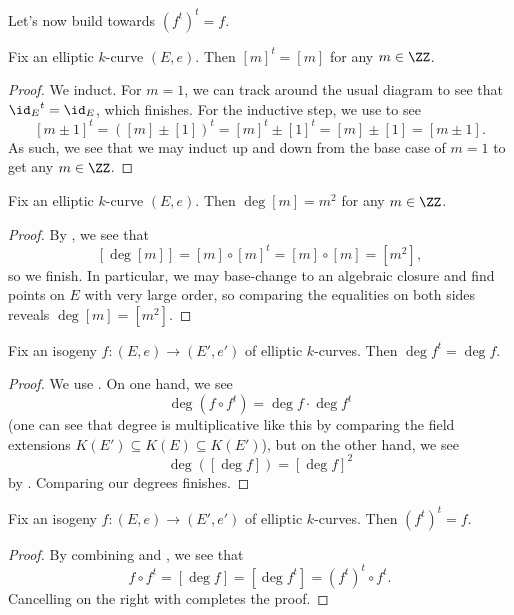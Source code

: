 \documentclass[../notes.tex]{subfiles}
\begin{document}
Let's now build towards $(f^t)^t=f$.
\begin{lemma} \label{lem:dual-mult}
	Fix an elliptic $k$-curve $(E,e)$. Then $[m]^t=[m]$ for any $m\in\ZZ$.
\end{lemma}
\begin{proof}
	We induct. For $m=1$, we can track around the usual diagram to see that ${\id_E}^t={\id_E}$, which finishes. For the inductive step, we use  to see
	\[[m\pm 1]^t=([m]\pm[1])^t=[m]^t\pm[1]^t=[m]\pm[1]=[m\pm1].\]
	As such, we see that we may induct up and down from the base case of $m=1$ to get any $m\in\ZZ$.
\end{proof}
\begin{corollary} \label{cor:deg-mult}
	Fix an elliptic $k$-curve $(E,e)$. Then $\deg[m]=m^2$ for any $m\in\ZZ$.
\end{corollary}
\begin{proof}
	By , we see that
	\[[\deg[m]]=[m]\circ[m]^t=[m]\circ[m]=\left[m^2\right],\]
	so we finish. In particular, we may base-change to an algebraic closure and find points on $E$ with very large order, so comparing the equalities on both sides reveals $\deg[m]=\left[m^2\right]$.
\end{proof}
\begin{lemma} \label{lem:dual-degree}
	Fix an isogeny $f\colon(E,e)\to(E',e')$ of elliptic $k$-curves. Then $\deg f^t=\deg f$.
\end{lemma}
\begin{proof}
	We use . On one hand, we see
	\[\deg\left(f\circ f^t\right)=\deg f\cdot\deg f^t\]
	(one can see that degree is multiplicative like this by comparing the field extensions $K(E')\subseteq K(E)\subseteq K(E')$), but on the other hand, we see
	\[\deg\left([\deg f]\right)=[\deg f]^2\]
	by . Comparing our degrees finishes.
\end{proof}
\begin{proposition}
	Fix an isogeny $f\colon(E,e)\to(E',e')$ of elliptic $k$-curves. Then $\left(f^t\right)^t=f$.
\end{proposition}
\begin{proof}
	By combining  and , we see that
	\[f\circ f^t=[\deg f]=\left[\deg f^t\right]=\left(f^t\right)^t\circ f^t.\]
	Cancelling on the right with  completes the proof.
\end{proof}
\end{document}

